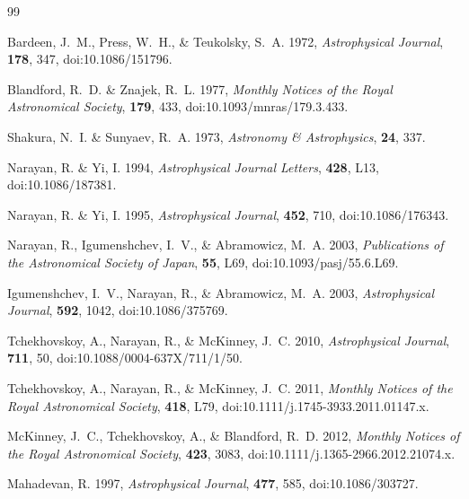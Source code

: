 \documentclass[11pt]{article}
\begin{document}

\begin{thebibliography}{99}

Bardeen, J.~M., Press, W.~H., \& Teukolsky, S.~A. 1972,
\emph{Astrophysical Journal}, \textbf{178}, 347,
doi:10.1086/151796.

Blandford, R.~D. \& Znajek, R.~L. 1977,
\emph{Monthly Notices of the Royal Astronomical Society}, \textbf{179}, 433,
doi:10.1093/mnras/179.3.433.

Shakura, N.~I. \& Sunyaev, R.~A. 1973,
\emph{Astronomy \& Astrophysics}, \textbf{24}, 337.

Narayan, R. \& Yi, I. 1994,
\emph{Astrophysical Journal Letters}, \textbf{428}, L13,
doi:10.1086/187381.

Narayan, R. \& Yi, I. 1995,
\emph{Astrophysical Journal}, \textbf{452}, 710,
doi:10.1086/176343.

Narayan, R., Igumenshchev, I.~V., \& Abramowicz, M.~A. 2003,
\emph{Publications of the Astronomical Society of Japan}, \textbf{55}, L69,
doi:10.1093/pasj/55.6.L69.

Igumenshchev, I.~V., Narayan, R., \& Abramowicz, M.~A. 2003,
\emph{Astrophysical Journal}, \textbf{592}, 1042,
doi:10.1086/375769.

Tchekhovskoy, A., Narayan, R., \& McKinney, J.~C. 2010,
\emph{Astrophysical Journal}, \textbf{711}, 50,
doi:10.1088/0004-637X/711/1/50.

Tchekhovskoy, A., Narayan, R., \& McKinney, J.~C. 2011,
\emph{Monthly Notices of the Royal Astronomical Society}, \textbf{418}, L79,
doi:10.1111/j.1745-3933.2011.01147.x.

McKinney, J.~C., Tchekhovskoy, A., \& Blandford, R.~D. 2012,
\emph{Monthly Notices of the Royal Astronomical Society}, \textbf{423}, 3083,
doi:10.1111/j.1365-2966.2012.21074.x.

Mahadevan, R. 1997,
\emph{Astrophysical Journal}, \textbf{477}, 585,
doi:10.1086/303727.


\end{thebibliography}
\end{document}
